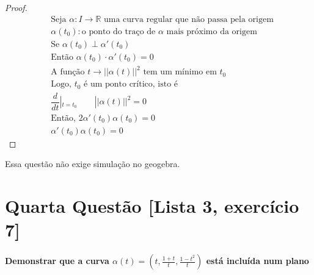 \documentclass[fleqn]{article}
\begin{document}
\begin{proof}
\begin{align*}
 & \text{Seja } \alpha: I \rightarrow \mathbb{R}  \text{ uma curva regular que não passa pela origem} \\
  & \alpha (t_{0}): \text{o ponto do traço de } \alpha  \text{ mais próximo da origem}\\
&   \text{Se } \alpha (t_{0}) \perp \alpha'(t_{0}) \\
 &  \text{Então } \alpha (t_{0}) \cdotp \alpha'(t_{0}) = 0 \\
 & \text{A função } t \rightarrow  || \alpha (t) ||^2 \text{ tem um mínimo em }  t_{0}    \\
&  \text{Logo, } t_{0} \text{ é um ponto crítico, isto é } \\
 & \dfrac{d}{dt} |_{t = t_{0}} \quad  \quad  || \alpha (t) ||^2 = 0 \\
  &\text{Então, } 2\alpha'(t_{0})\alpha (t_{0})=0   \\ 
  &\alpha'(t_{0})\alpha (t_{0})=0
\end{align*}
\end{proof}

\bigskip

Essa questão não exige simulação no geogebra.

\newpage

\section*{Quarta Questão [Lista 3, exercício 7]} 

\paragraph{Demonstrar que a curva ${\alpha (t) =  (t, \frac{1+t}{t}, \frac{1-t^2}{t})}$  está incluída num plano} 
\end{document}

